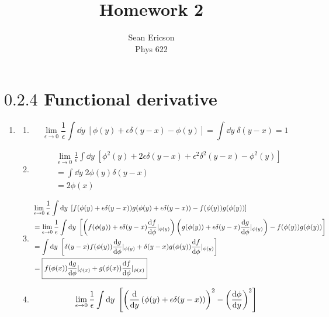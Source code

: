 \documentclass[12pt]{article}
\begin{document}
\title{Homework 2}
\author{Sean Ericson \\ Phys 622}
\maketitle

\section*{$0.2.4$ Functional derivative}
\begin{enumerate}[label=(\alph*)]
    \item \;
    \begin{enumerate}[label=(\roman*)]
        \item \[ \lim_{\epsilon\to 0} \frac{1}{\epsilon}\int\dd y \; \left[\phi(y) + \epsilon\delta(y-x) - \phi(y)\right] = \int\dd y \; \delta(y-x) = \boxed{1} \]
        \item
        \begin{align*}
            &\lim_{\epsilon\to 0} \frac{1}{\epsilon}\int\dd y \; \left[\phi^2(y) + 2\epsilon\delta(y-x) + \epsilon^2\delta^2(y-x) - \phi^2(y)\right] \\
            &= \int \dd y \; 2\phi(y)\delta(y-x) \\
            &= \boxed{2\phi(x)}
        \end{align*}
        \item
        \begin{align*}
            &\lim_{\epsilon\to 0} \frac{1}{\epsilon}\int\dd y \; \left[f(\phi(y) + \epsilon\delta(y-x))g(\phi(y) + \epsilon\delta(y-x)) - f(\phi(y))g(\phi(y))\right] \\
            &= \lim_{\epsilon\to 0} \frac{1}{\epsilon}\int\dd y \; \left[\left(f(\phi(y)) + \epsilon\delta(y-x)\dv{f}{\phi}|_{\phi(y)}\right)\left(g(\phi(y)) + \epsilon\delta(y-x)\dv{g}{\phi}|_{\phi(y)}\right) - f(\phi(y))g(\phi(y))\right] \\
            &= \int\dd y \; \left[\delta(y-x)f(\phi(y))\dv{g}{\phi}|_{\phi(y)} + \delta(y-x)g(\phi(y))\dv{f}{\phi}|_{\phi(y)}\right] \\
            &= \boxed{f(\phi(x))\dv{g}{\phi}|_{\phi(x)} + g(\phi(x))\dv{f}{\phi}|_{\phi(x)}}
        \end{align*}
        \item 
        \begin{align*}
            &\lim_{\epsilon\to 0}\frac{1}{\epsilon}\int \dd y\; \left[\left(\dv{y}\left(\phi(y) + \epsilon\delta(y-x)\right)\right)^2 - \left(\dv{\phi}{y}\right)^2\right] \\

\end{align*}
\end{enumerate}
\end{enumerate}
\end{document}
